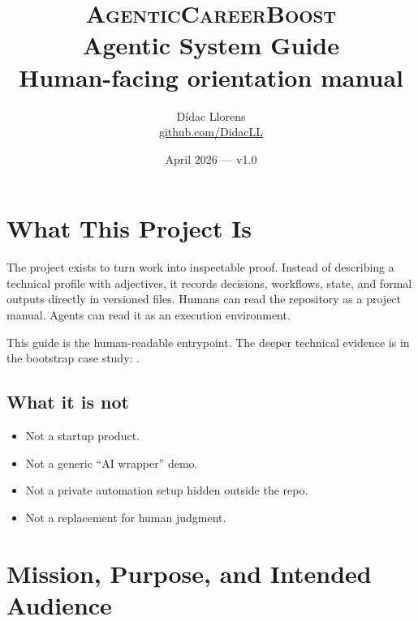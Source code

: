 \documentclass[a4paper,11pt,openany]{report}
\title{%
  \textsc{AgenticCareerBoost}\\[0.4em]
  \Large Agentic System Guide\\[0.3em]
  \large Human-facing orientation manual%
}
\author{Dídac Llorens \\ \small \href{https://github.com/DidacLL}{github.com/DidacLL}}
\date{April 2026 --- v1.0}
\begin{document}
\maketitle
\tableofcontents
\newpage

\chapter{What This Project Is}


The project exists to turn work into inspectable proof. Instead of describing a
technical profile with adjectives, it records decisions, workflows, state, and
formal outputs directly in versioned files. Humans can read the repository as a
project manual. Agents can read it as an execution environment.

This guide is the human-readable entrypoint. The deeper technical evidence is in
the bootstrap case study:
.

\section{What it is not}

\begin{itemize}
  \item Not a startup product.
  \item Not a generic ``AI wrapper'' demo.
  \item Not a private automation setup hidden outside the repo.
  \item Not a replacement for human judgment.
\end{itemize}



\chapter{Mission, Purpose, and Intended Audience}
\end{document}
